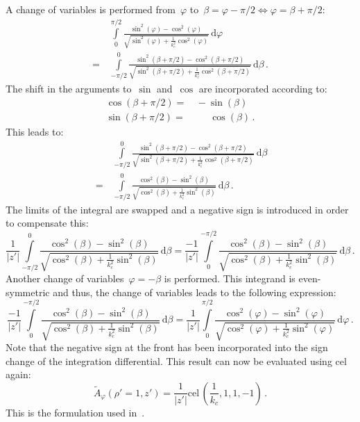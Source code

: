 A change of variables is performed from~$\varphi$ to~$\beta = \varphi - \pi/2 \Leftrightarrow \varphi = \beta + \pi/2$:
\begin{align}
 ~&\,  \int\limits_0^{\pi/2} \frac{\sin^2(\varphi) - \cos^2(\varphi)}{\sqrt{\sin^2(\varphi) + \frac{1}{k_c^2} \cos^2(\varphi)}} \,\mathrm{d}\varphi \nonumber \\
 =&\, \int\limits_{-\pi/2}^{0} \frac{\sin^2(\beta + \pi/2) - \cos^2(\beta + \pi/2)}{\sqrt{\sin^2(\beta + \pi/2) + \frac{1}{k_c^2} \cos^2(\beta + \pi/2)}} \,\mathrm{d}\beta \, .
\end{align}
The shift in the arguments to~$\sin$ and~$\cos$ are incorporated according to:
\begin{align}
  \cos(\beta + \pi/2) =&\,          -    \sin(\beta) \\
  \sin(\beta + \pi/2) =&\, \phantom{-}\, \cos(\beta) \, .
\end{align}
This leads to:
\begin{align}
 ~  &\, \int\limits_{-\pi/2}^{0} \frac{\sin^2(\beta + \pi/2) - \cos^2(\beta + \pi/2)}{\sqrt{\sin^2(\beta + \pi/2) + \frac{1}{k_c^2} \cos^2(\beta + \pi/2)}} \,\mathrm{d}\beta \nonumber \\
 ~ =&\, \int\limits_{-\pi/2}^{0} \frac{\cos^2(\beta) - \sin^2(\beta)}{\sqrt{\cos^2(\beta ) + \frac{1}{k_c^2} \sin^2(\beta)}} \,\mathrm{d}\beta \, .
\end{align}
The limits of the integral are swapped and a negative sign is introduced in order to compensate this:
\begin{equation}
   \frac{1}{|z'|} \int\limits_{-\pi/2}^{0} \frac{\cos^2(\beta) - \sin^2(\beta)}{\sqrt{\cos^2(\beta ) + \frac{1}{k_c^2} \sin^2(\beta)}} \,\mathrm{d}\beta
 = \frac{-1}{|z'|} \int\limits_{0}^{-\pi/2} \frac{\cos^2(\beta) - \sin^2(\beta)}{\sqrt{\cos^2(\beta ) + \frac{1}{k_c^2} \sin^2(\beta)}} \,\mathrm{d}\beta \, .
\end{equation}
Another change of variables~$\varphi = -\beta$ is performed.
This integrand is even-symmetric and thus, the change of variables leads to
the following expression:
\begin{equation}
   \frac{-1}{|z'|} \int\limits_{0}^{-\pi/2} \frac{\cos^2(\beta) - \sin^2(\beta)}{\sqrt{\cos^2(\beta ) + \frac{1}{k_c^2} \sin^2(\beta)}} \,\mathrm{d}\beta
 = \frac{1}{|z'|} \int\limits_{0}^{\pi/2} \frac{\cos^2(\varphi) - \sin^2(\varphi)}{\sqrt{\cos^2(\varphi) + \frac{1}{k_c^2} \sin^2(\varphi)}} \,\mathrm{d}\varphi \, .
\end{equation}
Note that the negative sign at the front has been incorporated into the sign change of the integration differential.
This result can now be evaluated using cel again:
\begin{equation}
  \tilde{A}_\varphi(\rho'=1,z') = \frac{1}{|z'|} \textrm{cel}\,\left(\frac{1}{k_c}, 1, 1, -1\right) \label{eqn:cwl_A_phi_v_derivation} \, .
\end{equation}
This is the formulation used in~.

